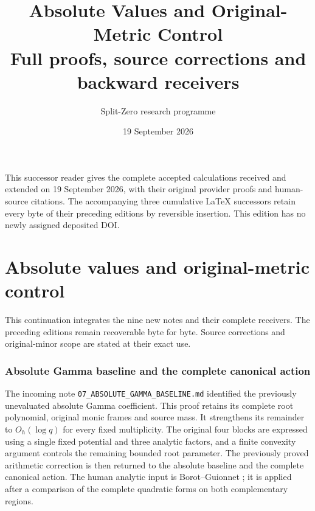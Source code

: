 \documentclass[11pt,a4paper]{article}
\title{Absolute Values and Original-Metric Control\\[0.6em]\large Full proofs, source corrections and backward receivers}
\author{Split-Zero research programme}
\date{19 September 2026}
\providecommand{\diag}{\operatorname{diag}}
\providecommand{\dd}{\,d}
\providecommand{\PP}{\mathcal P}
\begin{document}
\maketitle
\noindent This successor reader gives the complete accepted calculations received and
extended on 19 September 2026, with their original provider proofs and
human-source citations. The accompanying three cumulative LaTeX successors
retain every byte of their preceding editions by reversible insertion.
This edition has no newly assigned deposited DOI.
\tableofcontents
\begingroup
\clearpage
\part{Absolute values and original-metric control}
\noindent This continuation integrates the nine new notes and their complete
receivers. The preceding editions remain recoverable byte for byte. Source
corrections and original-minor scope are stated at their exact use.
\providecommand{\tightlist}{\setlength{\itemsep}{0pt}\setlength{\parskip}{0pt}}
\providecommand{\C}{\mathbb C}\providecommand{\R}{\mathbb R}
\providecommand{\Z}{\mathbb Z}\providecommand{\Q}{\mathbb Q}
\providecommand{\N}{\mathbb N}
\providecommand{\im}{\operatorname{im}}
\providecommand{\diag}{\operatorname{diag}}
\providecommand{\Gr}{\operatorname{Gram}}
\providecommand{\Gram}{\operatorname{Gram}}
\providecommand{\Res}{\operatorname{Res}}
\providecommand{\cond}{\operatorname{cond}}
\providecommand{\ExtensionTok}[1]{#1}\providecommand{\NormalTok}[1]{#1}
\providecommand{\StringTok}[1]{#1}\providecommand{\BuiltInTok}[1]{#1}
\providecommand{\ControlFlowTok}[1]{#1}

\clearpage
\begingroup
\def\R{\mathbb R}
\def\C{\mathbb C}
\def\PP{\mathcal P}
\def\BB{\mathcal B}
\def\dd{\,d}
\def\Gram{\operatorname{Gram}}

\setcounter{equation}{0}
\renewcommand{\theequation}{A03AG.\arabic{equation}}
\section*{Absolute Gamma baseline and the complete canonical action}


\noindent The incoming note \texttt{07\_ABSOLUTE\_GAMMA\_BASELINE.md}
identified the previously unevaluated absolute Gamma coefficient. This proof
retains its complete root polynomial, original monic frames and source mass.
It strengthens its remainder to $O_h(\log q)$ for every fixed multiplicity.
The original four blocks are expressed using a single fixed potential and
three analytic factors, and a finite convexity argument controls the remaining
bounded root parameter. The previously proved arithmetic correction is then
returned to the absolute baseline and the complete canonical action.
The human analytic input is Borot--Guionnet \cite{a03ag:BG}; it is applied after
a comparison of the complete quadratic forms on both complementary regions.
\end{document}
